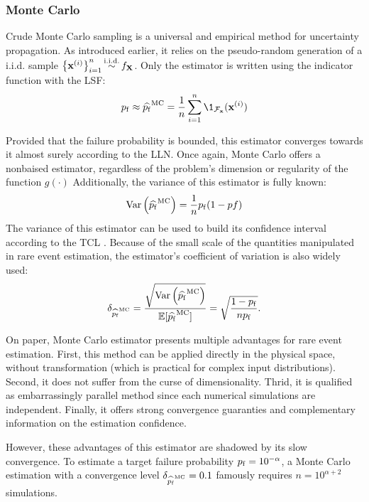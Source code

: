 \subsubsection{Monte Carlo}
Crude Monte Carlo sampling is a universal and empirical method for uncertainty propagation. 
As introduced earlier, it relies on the pseudo-random generation of a i.i.d. sample $\left\{{\bf x}^{(i)}\right\}_{i=1}^n \mathop{\sim}\limits^{\mathrm{i.i.d.}} f_{\bf X}$.   
Only the estimator is written using the indicator function with the LSF: 
\begin{equation}
    \pf \approx \what{\pf}^{\textrm{MC}} = \frac1n \sum_{i=1}^{n} \1_{\iF_\bx}(\bx^{(i)})
\end{equation} 

Provided that the failure probability is bounded, this estimator converges towards it almost surely according to the LLN. 
Once again, Monte Carlo offers a nonbaised estimator, regardless of the problem's dimension or regularity of the function $g(\cdot)$  
Additionally, the variance of this estimator is fully known:
\begin{equation}
    \operatorname{Var}\left(\widehat{p_\mathrm{f}}^{\textrm{MC}}\right) = \frac1n p_\mathrm{f} (1 - pf)
\end{equation} 
The variance of this estimator can be used to build its confidence interval according to the TCL . 
Because of the small scale of the quantities manipulated in rare event estimation, the estimator's coefficient of variation is also widely used: 
\begin{equation}
    \delta_{\widehat{p_\mathrm{f}}^{\textrm{MC}}} = \frac{\sqrt{\operatorname{Var}\left(\widehat{p_\mathrm{f}}^{\textrm{MC}}\right)}}{\mathbb{E}[\widehat{p_\mathrm{f}}^{\textrm{MC}}]}
                                      = \sqrt{\frac{1 - p_\mathrm{f}}{n p_\mathrm{f}}}.
\end{equation}

On paper, Monte Carlo estimator presents multiple advantages for rare event estimation.
First, this method can be applied directly in the physical space, without transformation (which is practical for complex input distributions).
Second, it does not suffer from the curse of dimensionality. 
Thrid, it is qualified as embarrassingly parallel method since each numerical simulations are independent.
Finally, it offers strong convergence guaranties and complementary information on the estimation confidence.


However, these advantages of this estimator are shadowed by its slow convergence. 
To estimate a target failure probability $p_\mathrm{f}=10^{-\alpha}$, 
a Monte Carlo estimation with a convergence level $\delta_{\widehat{p_\mathrm{f}}^{\textrm{MC}}} = 0.1$ famously requires $n=10^{\alpha + 2}$ simulations. 

